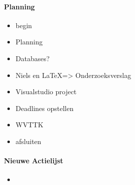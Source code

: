 \documentclass[11pt]{article}
\begin{document}
\paragraph{Planning}
\begin{itemize}
	\item begin
	\item Planning
	\item Databases?
	\item Niels en \LaTeX => Onderzoeksverslag
	\item Visualstudio project
	\item Deadlines opstellen
	\item WVTTK
	\item afsluiten
	
\end{itemize}

\paragraph{Nieuwe Actielijst}
\begin{itemize}
	\item 
\end{itemize}
\end{document}
